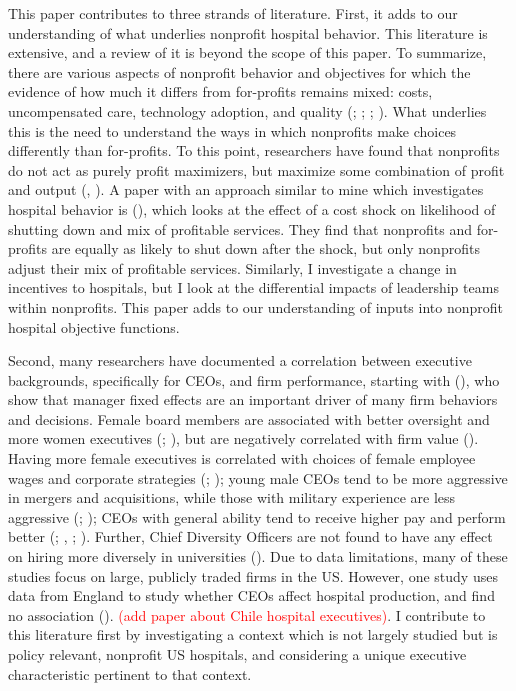 \documentclass[12pt]{article}
\begin{document}
    This paper contributes to three strands of literature. First, it adds to our understanding of what underlies nonprofit hospital behavior. This literature is extensive, and a review of it is beyond the scope of this paper. To summarize, there are various aspects of nonprofit behavior and objectives for which the evidence of how much it differs from for-profits remains mixed: costs, uncompensated care, technology adoption, and quality (\cite{sloan2000not}; \cite{eggleston2008hospital}; \cite{moscelli2018effect}; \cite{moscone2020public}). What underlies this is the need to understand the ways in which nonprofits make choices differently than for-profits. To this point, researchers have found that nonprofits do not act as purely profit maximizers, but maximize some combination of profit and output (\cite{deneffe2002not}, \cite{chang2011nonprofit}). A paper with an approach similar to mine which investigates hospital behavior is \citeauthor{chang2011nonprofit} (\citeyear{chang2011nonprofit}), which looks at the effect of a cost shock on likelihood of shutting down and mix of profitable services. They find that nonprofits and for-profits are equally as likely to shut down after the shock, but only nonprofits adjust their mix of profitable services. Similarly, I investigate a change in incentives to hospitals, but I look at the differential impacts of leadership teams within nonprofits. This paper adds to our understanding of inputs into nonprofit hospital objective functions. 

    Second, many researchers have documented a correlation between executive backgrounds, specifically for CEOs, and firm performance, starting with \citeauthor{bertrand2003managing} (\citeyear{bertrand2003managing}), who show that manager fixed effects are an important driver of many firm behaviors and decisions. Female board members are associated with better oversight and more women executives (\cite{matsa2011chipping}; \cite{adams2009women}), but are negatively correlated with firm value (\cite{ahern2012changing}). Having more female executives is correlated with choices of female employee wages and corporate strategies (\cite{flabbi2019female}; \cite{matsa2013female}); young male CEOs tend to be more aggressive in mergers and acquisitions, while those with military experience are less aggressive (\cite{levi2010deal}; \cite{benmelech2015military}); CEOs with general ability tend to receive higher pay and perform better (\cite{kaplan2012ceo}; \cite{custodio2013generalists}, \cite{adams2018director}; \cite{frydman2019rising}). Further, Chief Diversity Officers are not found to have any effect on hiring more diversely in universities (\cite{bradley2022impact}). Due to data limitations, many of these studies focus on large, publicly traded firms in the US. However, one study uses data from England to study whether CEOs affect hospital production, and find no association (\cite{janke2019impact}). \textcolor{red}{(add paper about Chile hospital executives)}. I contribute to this literature first by investigating a context which is not largely studied but is policy relevant, nonprofit US hospitals, and considering a unique executive characteristic pertinent to that context. 
\end{document}
